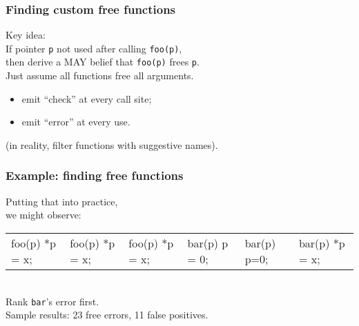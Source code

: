\documentclass{beamer}
\newenvironment{changemargin}[1]{%
  \begin{list}{}{%
    \setlength{\topsep}{0pt}%
    \setlength{\leftmargin}{#1}%
    \setlength{\rightmargin}{1em}
    \setlength{\listparindent}{\parindent}%
    \setlength{\itemindent}{\parindent}%
    \setlength{\parsep}{\parskip}%
  }%
  \item[]}{\end{list}}
\begin{document}
\begin{frame}
\frametitle{Finding custom free functions}
  \begin{changemargin}{2cm}
    Key idea:\\
    If pointer {\tt p} not used after calling {\tt foo(p)},\\
    then derive a MAY belief that {\tt foo(p)} frees {\tt p}.\\[2em]

    Just assume all functions free all arguments.
\begin{itemize}
\item emit ``check'' at every call site;
\item emit ``error'' at every use.
\end{itemize}
    (in reality, filter functions with suggestive names).
  \end{changemargin}
\end{frame}

\begin{frame}
\frametitle{Example: finding free functions}
  \begin{changemargin}{2cm}
Putting that into practice, \\
we might observe:\\[1em]
\begin{tabular}{l|l|l|l|l|l}
\begin{minipage}{3em}
foo(p)
*p = x;
\end{minipage} &
\begin{minipage}{3em}
foo(p)
*p = x;
\end{minipage} &
\begin{minipage}{3em}
foo(p)
*p = x;
\end{minipage} &
\begin{minipage}{3em}
bar(p)
p = 0;
\end{minipage} &
\begin{minipage}{3em}
bar(p)
p=0;
\end{minipage} &
\begin{minipage}{3em}
bar(p)
*p = x;
\end{minipage} 
\end{tabular}
~\\[1em]
Rank {\tt bar}'s error first.\\
Sample results: 23 free errors, 11 false positives.
  \end{changemargin}
\end{frame}
\end{document}
